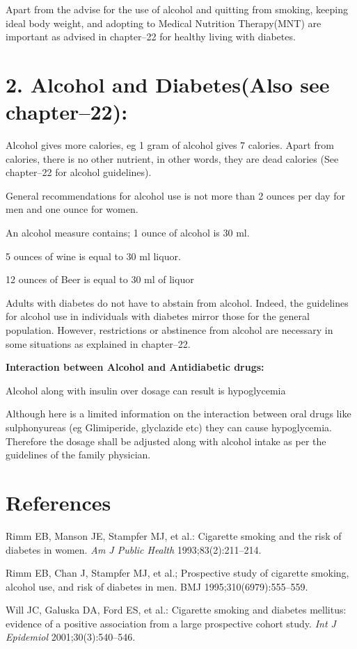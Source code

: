 Apart from the advise for the use of alcohol and quitting from smoking, keeping ideal body weight, and adopting to Medical Nutrition Therapy(MNT) are important as advised in chapter–22 for healthy living with diabetes.


\section{2. Alcohol and Diabetes(Also see chapter–22):}

Alcohol gives more calories, eg 1 gram of alcohol gives 7 calories. Apart from calories, there is no other nutrient, in other words, they are dead calories (See chapter–22 for alcohol guidelines).

General recommendations for alcohol use is not more than 2 ounces per day for men and one ounce for women.

\item An alcohol measure contains; 1 ounce of alcohol is 30 ml.

 \item 5 ounces of wine is equal to 30 ml liquor.

 \item 12 ounces of Beer is equal to 30 ml of liquor

Adults with diabetes do not have to abstain from alcohol. Indeed, the guidelines for alcohol use in individuals with diabetes mirror those for the general population. However, restrictions or abstinence from alcohol are necessary in some situations as explained in chapter–22.

\textbf{Interaction between Alcohol and Antidiabetic drugs:}

\item Alcohol along with insulin over dosage can result is hypoglycemia

 \item Although here is a limited information on the interaction between oral drugs like sulphonyureas (eg Glimiperide, glyclazide etc) they can cause hypoglycemia. Therefore the dosage shall be adjusted along with alcohol intake as per the guidelines of the family physician.



\section*{References}

\begin{thebibliography}{99}
 Rimm EB, Manson JE, Stampfer MJ, et al.: Cigarette smoking and the risk of diabetes in women. \textit{Am J Public Health} 1993;83(2):211–214.

  Rimm EB, Chan J, Stampfer MJ, et al.; Prospective study of cigarette smoking, alcohol use, and risk of diabetes in men. BMJ 1995;310(6979):555–559.

  Will JC, Galuska DA, Ford ES, et al.: Cigarette smoking and diabetes mellitus: evidence of a positive association from a large prospective cohort study. \textit{Int J Epidemiol} 2001;30(3):540–546.

 \end{thebibliography}

